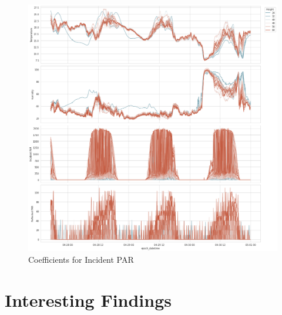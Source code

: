 \documentclass[11pt, letterpaper]{article}
\begin{document}
\begin{figure}[h!]
\centering
\includegraphics[width=1.0\textwidth]{eda_3.4.png}
\captionsetup{justification=centering}
\caption{Coefficients for Incident PAR}
\end{figure}

\section{Interesting Findings}
\end{document}
